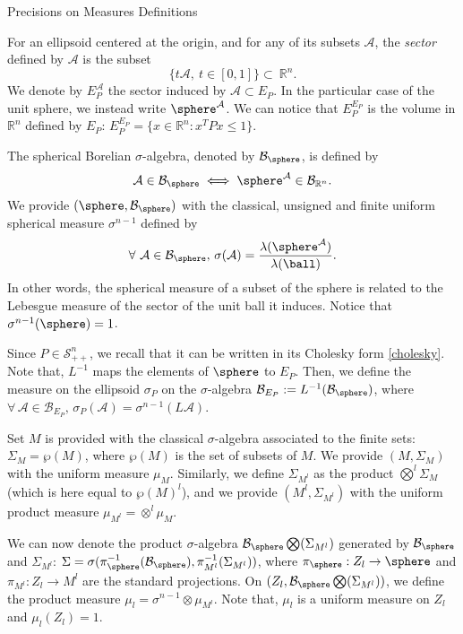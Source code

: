 \begin{section}{Precisions on Measures Definitions}\label{app:measures}

For an ellipsoid centered at the origin, and for any of its subsets $\mathcal{A}$, the \emph{sector} defined by $\mathcal{A}$ is the subset $$\{t \mathcal{A}, \ t \in [0,1]\} \subset\ \mathbb{R}^n.$$ We denote by $E_P^{\mathcal{A}}$ the sector induced by $\mathcal{A} \subset E_P$. In the particular case of the unit sphere, we instead write $\sphere^{\mathcal{A}}$. We can notice that $E_P^{E_P}$ is the volume in $\mathbb{R}^n$ defined by $E_P$: $E_P^{E_P} = \{x \in \mathbb{R}^n: x^T P x \leq 1\}$.

The spherical Borelian $\sigma$-algebra, denoted by $\mathcal{B}_{\sphere}$, is defined by $$\mathcal{A} \in \mathcal{B}_{\sphere} \iff \sphere^{\mathcal{A}} \in \mathcal{B}_{\mathbb{R}^n}.$$ We provide $(\sphere,\mathcal{B}_{\sphere})$ with the classical, unsigned and finite uniform spherical measure $\sigma^{n-1}$ defined by
$$\forall\ \mathcal{A} \in \mathcal{B}_{\sphere},\, \sigma(\mathcal{A}) = \frac{\lambda(\sphere^{\mathcal{A}})}{\lambda(\ball)}. $$
In other words, the spherical measure of a subset of the sphere is related to the Lebesgue measure of the sector of the unit ball it induces. Notice that $\sigma^{n-1}(\sphere) = 1$.

Since $P \in \mathcal{S}_{++}^n$, we recall that it can be written in its Cholesky form \eqref{cholesky}. Note that, $L^{-1}$ maps the elements of $\sphere$ to $E_P$. Then, we define the measure on the ellipsoid $\sigma_P$ on the $\sigma$-algebra $\mathcal{B}_{E_P}:=L^{-1}(\mathcal{B}_\sphere)$, where $\forall\, \mathcal{A} \in \mathcal{B}_{E_P},\, \sigma_P({\mathcal{A}}) = \sigma^{n-1}(L\mathcal{A})$. 

Set $M$ is provided with the classical $\sigma$-algebra associated to the finite sets: $\Sigma_M = \wp(M)$, where $\wp(M)$ is the set of subsets of $M$. We provide $(M, \Sigma_M)$ with the uniform measure $\mu_M$. Similarly, we define $\Sigma_{M^l}$ as the product $\bigotimes^l \Sigma_M$ (which is here equal to $\wp(M)^l$), and we provide $(M^l, \Sigma_{M^l})$ with the uniform product measure $\mu_{M^l} = \otimes^l \mu_M$.

We can now denote the product $\sigma$-algebra $\mathcal{B}_{\sphere} \bigotimes (\Sigma_{M^l})$ generated by $\mathcal{B}_{\sphere}$ and $\Sigma_{M^l}$: $\Sigma = \sigma( \pi_{\sphere}^{-1}(\mathcal{B}_{\sphere}),  \pi_{M^l}^{-1}(\Sigma_{M^l}))$, where $\pi_{\sphere}: Z_l \to \sphere$ and $\pi_{M^l}: Z_l \to M^l$ are the standard projections. On $(Z_l,\mathcal{B}_{\sphere} \bigotimes (\Sigma_{M^l}) )$, we define the product measure $\mu_l = \sigma^{n-1} \otimes \mu_{M^l}$. Note that, $\mu_l$ is a uniform measure on $Z_l$ and $\mu_l(Z_l)=1$.  

\end{section}


